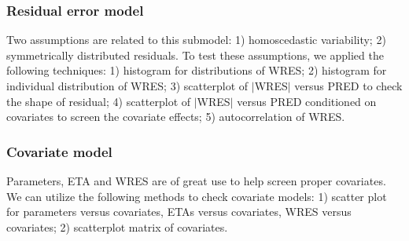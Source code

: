 \documentclass[a4paper]{article}
\begin{document}
\subsubsection{Residual error model}
Two assumptions are related to this submodel: 1) homoscedastic variability; 2) symmetrically distributed residuals. To test these assumptions, we applied the following techniques: 1) histogram for distributions of WRES; 2) histogram for individual distribution of WRES; 3) scatterplot of $|$WRES$|$ versus PRED to check the shape of residual; 4) scatterplot of $|$WRES$|$ versus PRED conditioned on covariates to screen the covariate effects; 5) autocorrelation of WRES.
\subsubsection{Covariate model}
Parameters, ETA and WRES are of great use to help screen proper covariates. We can utilize the following methods to check covariate models: 1) scatter plot for parameters versus covariates, ETAs versus covariates, WRES versus covariates; 2) scatterplot matrix of covariates.

\end{document}
